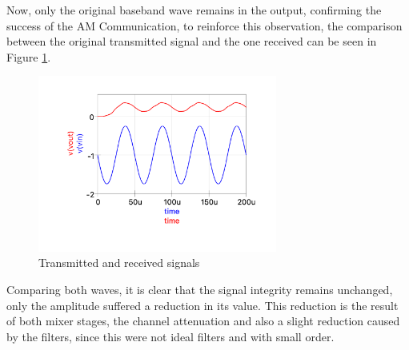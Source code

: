 Now, only the original baseband wave remains in the output, confirming the success of the AM Communication, to reinforce this observation, the comparison between the original transmitted signal and the one received can be seen in Figure \ref{fig:Qucs_vout/vin}.

\begin{figure}[H]
    \centering
    \includegraphics*[width=0.7\textwidth]{Images/Qucs_vin:vout.png}
    \caption{Transmitted and received signals}
    \label{fig:Qucs_vout/vin}
\end{figure}

Comparing both waves, it is clear that the signal integrity remains unchanged, only the amplitude suffered a reduction in its value. This reduction is the result of both mixer stages, the channel attenuation and also a slight reduction caused by the filters, since this were not ideal filters and with small order.